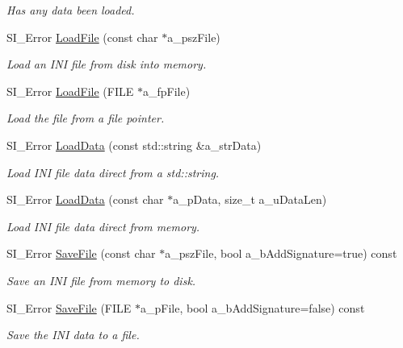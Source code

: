 \begin{DoxyCompactItemize}
\begin{DoxyCompactList}\small\item\em Has any data been loaded. \end{DoxyCompactList}\item 
S\+I\+\_\+\+Error \hyperlink{class_c_simple_ini_templ_aebb6e5fff76efc05ca6cc4b7b56481a3}{Load\+File} (const char $\ast$a\+\_\+psz\+File)
\begin{DoxyCompactList}\small\item\em Load an I\+NI file from disk into memory. \end{DoxyCompactList}\item 
S\+I\+\_\+\+Error \hyperlink{class_c_simple_ini_templ_a7ccb65e82fa347b42b59330968f826ae}{Load\+File} (F\+I\+LE $\ast$a\+\_\+fp\+File)
\begin{DoxyCompactList}\small\item\em Load the file from a file pointer. \end{DoxyCompactList}\item 
S\+I\+\_\+\+Error \hyperlink{class_c_simple_ini_templ_a174244fd3e09ff78da05fe46be86e714}{Load\+Data} (const std\+::string \&a\+\_\+str\+Data)
\begin{DoxyCompactList}\small\item\em Load I\+NI file data direct from a std\+::string. \end{DoxyCompactList}\item 
S\+I\+\_\+\+Error \hyperlink{class_c_simple_ini_templ_aa797cf47cec05906f07d5065882af4d3}{Load\+Data} (const char $\ast$a\+\_\+p\+Data, size\+\_\+t a\+\_\+u\+Data\+Len)
\begin{DoxyCompactList}\small\item\em Load I\+NI file data direct from memory. \end{DoxyCompactList}\item 
S\+I\+\_\+\+Error \hyperlink{class_c_simple_ini_templ_a1449e083d968790ef7479de24edddba0}{Save\+File} (const char $\ast$a\+\_\+psz\+File, bool a\+\_\+b\+Add\+Signature=true) const 
\begin{DoxyCompactList}\small\item\em Save an I\+NI file from memory to disk. \end{DoxyCompactList}\item 
S\+I\+\_\+\+Error \hyperlink{class_c_simple_ini_templ_af3f26b331a0f9d7f071d7b4aa8038758}{Save\+File} (F\+I\+LE $\ast$a\+\_\+p\+File, bool a\+\_\+b\+Add\+Signature=false) const 
\begin{DoxyCompactList}\small\item\em Save the I\+NI data to a file. \end{DoxyCompactList}\item 

\end{DoxyCompactItemize}
